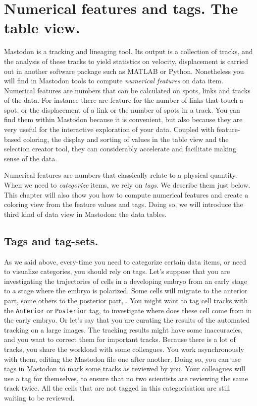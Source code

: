 \section{Numerical features and tags. The table view.}

Mastodon is a tracking and lineaging tool.
Its output is a collection of tracks, and the analysis of these tracks to yield statistics on \eg velocity, displacement \etc is carried out in another software package such as MATLAB or Python.
Nonetheless you will find in Mastodon tools to compute \textit{numerical features} on data item. 
Numerical features are numbers that can be calculated on spots, links and tracks of the data. 
For instance there are feature for the number of links that touch a spot, or the displacement of a link or the number of spots in a track.
You can find them within Mastodon because it is convenient, but also because they are very useful for the interactive exploration of your data. 
Coupled with feature-based coloring, the display and sorting of values in the table view and the selection creator tool, they can considerably accelerate and facilitate making sense of the data.

Numerical features are numbers that classically relate to a physical quantity.
When we need to \textit{categorize} items, we rely on \textit{tags}.
We describe them just below. 
This chapter will also show you how to compute numerical features and create a coloring view from the feature values and  tags.
Doing so, we will introduce the third kind of data view in Mastodon: the data tables.


\subsection{Tags and tag-sets.}

As we said above, every-time you need to categorize certain data items, or need to visualize categories, you should rely on tags.
Let's suppose that you are investigating the trajectories of cells in a developing embryo from an early stage to a stage where the embryo is polarized.
Some cells will migrate to the anterior part, some others to the posterior part, \etc. 
You might want to tag cell tracks with the \texttt{Anterior} or \texttt{Posterior} tag, to investigate where does these cell come from in the early embryo.
Or let's say that you are curating the results of the automated tracking on a large images. 
The tracking results might have some inaccuracies, and you want to correct them for important tracks.
Because there is a lot of tracks, you share the workload with some colleagues. 
You work asynchronously with them, editing the Mastodon file one after another. 
Doing so, you can use tags in Mastodon to mark some tracks as reviewed by you.
Your colleagues will use a tag for themselves, to ensure that no two scientists are reviewing the same track twice.
All the cells that are not tagged in this categorisation are still waiting to be reviewed. 

